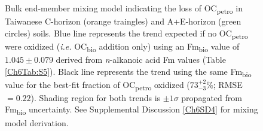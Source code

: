 \begin{figure}[t]
	\caption[Bulk $\Delta$\%OC vs. Fm mixing plot]{Bulk end-member mixing model indicating the loss of OC\textsubscript{petro} in Taiwanese C-horizon (orange traingles) and A+E-horizon (green circles) soils. Blue line represents the trend expected if no OC\textsubscript{petro} were oxidized (\textit{i.e.} OC\textsubscript{bio} addition only) using an Fm\textsubscript{bio} value of $1.045 \pm 0.079$ derived from \textit{n}-alkanoic acid Fm values (Table \ref{Ch6Tab:S5}). Black line represents the trend using the same Fm\textsubscript{bio} value for the best-fit fraction of OC\textsubscript{petro} oxidized ($73^{+2}_{-3}$\%; RMSE $= 0.22$). Shading region for both trends is $\pm 1\sigma$ propagated from Fm\textsubscript{bio} uncertainty. See Supplemental Discussion \ref{Ch6SD4} for mixing model derivation.}
	\label{Ch6Fig:1} 
\end{figure}

